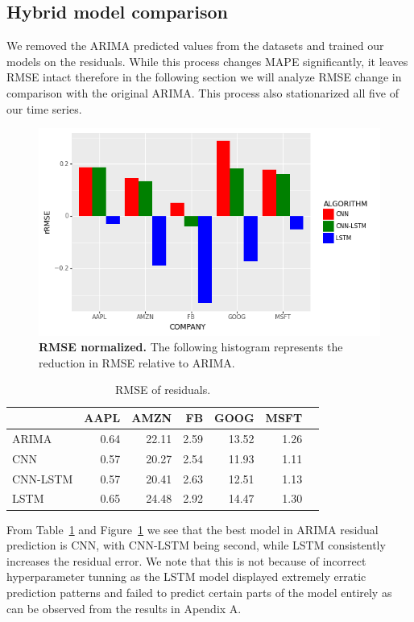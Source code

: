 \documentclass[12pt,journal,compsoc]{IEEEtran}
\begin{document}
\subsection{Hybrid model comparison}
\par We removed the ARIMA predicted values from the datasets and trained our models on the residuals.
While this process changes MAPE significantly, it leaves RMSE intact therefore in the following section we will analyze RMSE change in comparison with the original ARIMA. 
This process also stationarized all five of our time series.
\begin{figure}[!ht]\centering
	\includegraphics[width=\linewidth]{images/fig2.png}
	\caption{\textbf{RMSE normalized.} The following histogram represents the reduction in RMSE relative to ARIMA.}
	\label{fig:res2}
\end{figure}
\begin{table}[hbt]
	\caption{RMSE of residuals.}
	\centering
    \begin{tabular}{|l|r|r|r|r|r|r|}
    \toprule
    \hline
    {} &  AAPL &   AMZN &    FB &   GOOG & MSFT \\
    \hline
    \midrule
    ARIMA     &  0.64 &  22.11 &  2.59 &  13.52 &  1.26 \\
    CNN       &  0.57 &  20.27 &  2.54 &  11.93 &  1.11 \\
    CNN-LSTM  &  0.57 &  20.41 &  2.63 &  12.51 &  1.13 \\
    LSTM      &  0.65 &  24.48 &  2.92 &  14.47 &  1.30 \\
    \hline
    \bottomrule
    \end{tabular}
	\label{tab:res2}
\end{table}
\par From Table~\ref{fig:res2} and Figure~\ref{tab:res2} we see that the best model in ARIMA residual prediction is CNN, with CNN-LSTM being second,
while LSTM consistently increases the residual error.
We note that this is not because of incorrect hyperparameter tunning as the LSTM model displayed extremely erratic prediction patterns and failed to predict certain parts of the model entirely as can be observed from the results in Apendix A.
\end{document}
